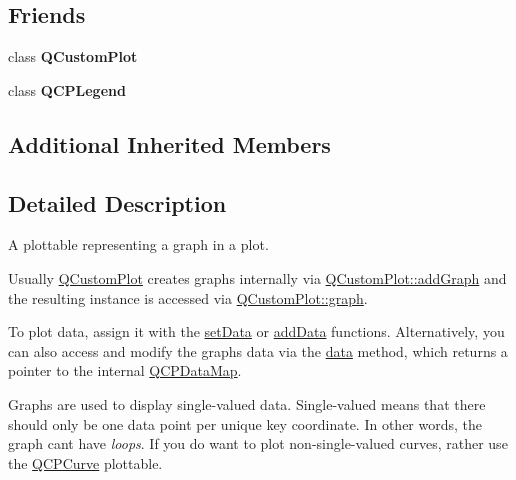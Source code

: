 \subsection*{Friends}
\begin{DoxyCompactItemize}
\item 
\hypertarget{classQCPGraph_a1cdf9df76adcfae45261690aa0ca2198}{}class {\bfseries Q\+Custom\+Plot}\label{classQCPGraph_a1cdf9df76adcfae45261690aa0ca2198}

\item 
\hypertarget{classQCPGraph_a8429035e7adfbd7f05805a6530ad5e3b}{}class {\bfseries Q\+C\+P\+Legend}\label{classQCPGraph_a8429035e7adfbd7f05805a6530ad5e3b}

\end{DoxyCompactItemize}
\subsection*{Additional Inherited Members}


\subsection{Detailed Description}
A plottable representing a graph in a plot. 



Usually \hyperlink{classQCustomPlot}{Q\+Custom\+Plot} creates graphs internally via \hyperlink{classQCustomPlot_a6fb2873d35a8a8089842d81a70a54167}{Q\+Custom\+Plot\+::add\+Graph} and the resulting instance is accessed via \hyperlink{classQCustomPlot_a6d3ed93c2bf46ab7fa670d66be4cddaf}{Q\+Custom\+Plot\+::graph}.

To plot data, assign it with the \hyperlink{classQCPGraph_a1df2fd710545c8ba3b2c99a39a27bf8b}{set\+Data} or \hyperlink{classQCPGraph_aa5c6181d84db72ce4dbe9dc15a34ef4f}{add\+Data} functions. Alternatively, you can also access and modify the graph\textquotesingle{}s data via the \hyperlink{classQCPGraph_a2f58436df4f86a2792b776a21642b3d9}{data} method, which returns a pointer to the internal \hyperlink{qcustomplot_8h_a84a9c4a4c2216ccfdcb5f3067cda76e3}{Q\+C\+P\+Data\+Map}.

Graphs are used to display single-\/valued data. Single-\/valued means that there should only be one data point per unique key coordinate. In other words, the graph can\textquotesingle{}t have {\itshape loops}. If you do want to plot non-\/single-\/valued curves, rather use the \hyperlink{classQCPCurve}{Q\+C\+P\+Curve} plottable.

